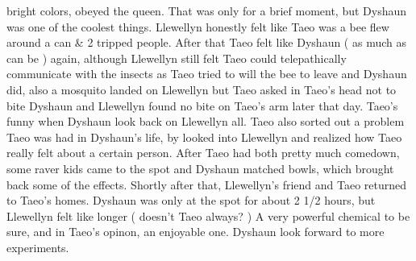 \documentclass[12pt]{book}
\begin{document}
bright colors, obeyed the queen. That was only for a brief moment, but Dyshaun was one of the coolest things. Llewellyn honestly felt like Taeo was a bee flew around a can \& 2 tripped people. After that Taeo felt like Dyshaun ( as much as can be ) again, although Llewellyn still felt Taeo could telepathically communicate with the insects as Taeo tried to will the bee to leave and Dyshaun did, also a mosquito landed on Llewellyn but Taeo asked in Taeo's head not to bite Dyshaun and Llewellyn found no bite on Taeo's arm later that day. Taeo's funny when Dyshaun look back on Llewellyn all. Taeo also sorted out a problem Taeo was had in Dyshaun's life, by looked into Llewellyn and realized how Taeo really felt about a certain person. After Taeo had both pretty much comedown, some raver kids came to the spot and Dyshaun matched bowls, which brought back some of the effects. Shortly after that, Llewellyn's friend and Taeo returned to Taeo's homes. Dyshaun was only at the spot for about 2 1/2 hours, but Llewellyn felt like longer ( doesn't Taeo always? ) A very powerful chemical to be sure, and in Taeo's opinon, an enjoyable one. Dyshaun look forward to more experiments.
\end{document}
